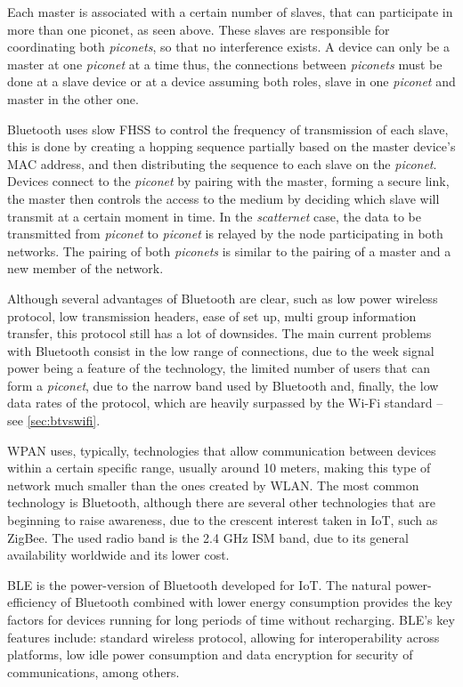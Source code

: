 Each master is associated with a certain number of slaves, that can participate in more than one piconet, as seen above. These slaves are responsible for coordinating both \textit{piconets}, so that no interference exists. A device can only be a master at one \textit{piconet} at a time thus, the connections between \textit{piconets} must be done at a slave device or at a device assuming both roles, slave in one \textit{piconet} and master in the other one.

Bluetooth uses slow \gls{FHSS} to control the frequency of transmission of each slave, this is done by creating a hopping sequence partially based on the master device's \gls{MAC} address, and then distributing the sequence to each slave on the \textit{piconet}. Devices connect to the \textit{piconet} by pairing with the master, forming a secure link, the master then controls the access to the medium by deciding which slave will transmit at a certain moment in time. In the \textit{scatternet} case, the data to be transmitted from \textit{piconet} to \textit{piconet} is relayed by the node participating in both networks. The pairing of both \textit{piconets} is similar to the pairing of a master and a new member of the network.

Although several advantages of Bluetooth are clear, such as low power wireless protocol, low transmission headers, ease of set up, multi group information transfer, this protocol still has a lot of downsides. The main current problems with Bluetooth consist in the low range of connections, due to the week signal power being a feature of the technology, the limited number of users that can form a \textit{piconet}, due to the narrow band used by Bluetooth and, finally, the low data rates of the protocol, which are heavily surpassed by the Wi-Fi standard -- see \ref{sec:btvswifi}.

\gls{WPAN} uses, typically, technologies that allow communication between devices within a certain specific range, usually around 10 meters, making this type of network much smaller than the ones created by \gls{WLAN}. The most common technology is Bluetooth, although there are several other technologies that are beginning to raise awareness, due to the crescent interest taken in \gls{IoT}, such as ZigBee. The used radio band is the 2.4 GHz \gls{ISM} band, due to its general availability worldwide and its lower cost.

\gls{BLE} is the power-version of Bluetooth developed for \gls{IoT}. The natural power-efficiency of Bluetooth combined with lower energy consumption provides the key factors for devices running for long periods of time without recharging. \gls{BLE}'s key features include: standard wireless protocol, allowing for interoperability across platforms, low idle power consumption and data encryption for security of communications, among others.

